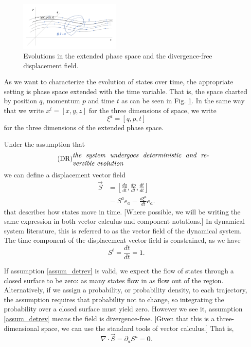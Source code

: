 \documentclass[fleqn,10pt]{wlscirep}
\begin{document}
\begin{figure}
	\includegraphics[width = 0.45\textwidth]{ExtendedPhaseSpace}
	\caption{\footnotesize{Evolutions in the extended phase space and the divergence-free displacement field.}}\label{extended_phase_space}
\end{figure}

As we want to characterize the evolution of states over time, the appropriate setting is phase space extended with the time variable\cite{lanczos1949variational,synge1960encyclopedia}. That is, the space charted by position $q$, momentum $p$ and time $t$ as can be seen in Fig. \ref{extended_phase_space}. In the same way that we write $x^i = [ x, y, z ]$ for the three dimensions of space, we write
\begin{equation}\label{sdof_variables}
	\xi^a = [ q, p, t]
\end{equation}
for the three dimensions of the extended phase space.

Under the assumption that
\begin{align}\label{assum_detrev}
	\tag*{(DR)}
	\parbox{2.8in}{\emph{the system undergoes deterministic and reversible evolution}}
\end{align}
we can define a displacement vector field
\begin{equation}\label{sdof_displacement}
	\begin{aligned}
		\vec{S} &= \left[ \frac{dq}{dt},\frac{dp}{dt},\frac{dt}{dt} \right] \\
		&= S^a e_a = \frac{d\xi^a}{dt} e_a .
	\end{aligned}
\end{equation}
that describes how states move in time. [Where possible, we will be writing the same expression in both vector calculus and component notations.] In dynamical system literature, this is referred to as the vector field of the dynamical system. The time component of the displacement vector field is constrained, as we have
\begin{equation}\label{sdof_time_constraint}
	S^t=\frac{dt}{dt}=1.
\end{equation}

If assumption \ref{assum_detrev} is valid, we expect the flow of states through a closed surface to be zero: as many states flow in as flow out of the region. Alternatively, if we assign a probability, or probability density, to each trajectory, the assumption requires that probability not to change, so integrating the probability over a closed surface must yield zero. However we see it, assumption \ref{assum_detrev} means the field is divergence-free.  [Given that this is a three-dimensional space, we can use the standard tools of vector calculus.] That is, 
\begin{equation}\label{sdof_div_free}
	\nabla \cdot \vec{S} = \partial_a S^a = 0.
\end{equation}
\end{document}
